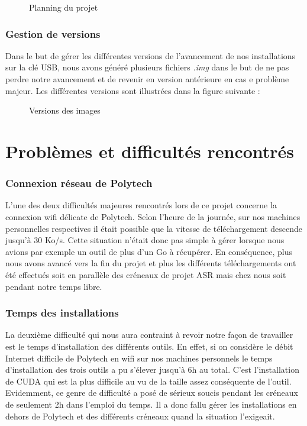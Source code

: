 \documentclass[final]{polytech/polytech}
\begin{document}
\begin{figure}
\caption{Planning du projet}
\label{fig:project_plan}
\end{figure}

\section{Gestion de versions}
Dans le but de gérer les différentes versions de l'avancement de nos installations sur la clé USB, nous avons généré plusieurs fichiers \textit{.img} dans le but de ne pas perdre notre avancement et de revenir en version antérieure en cas e problème majeur. Les différentes versions sont illustrées dans la figure suivante :

\begin{figure}
	\caption{Versions des images}
	\label{fig:images_versions}
\end{figure}

\part{Problèmes et difficultés rencontrés}

\section{Connexion réseau de Polytech}
L’une des deux difficultés majeures rencontrés lors de ce projet concerne la connexion wifi délicate de Polytech. Selon l’heure de la journée, sur nos machines personnelles respectives il était possible que la vitesse de téléchargement descende jusqu’à 30 Ko/s. Cette situation n’était donc pas simple à gérer lorsque nous avions par exemple un outil de plus d’un Go à récupérer. En conséquence, plus nous avons avancé vers la fin du projet et plus les différents téléchargements ont été effectués soit en parallèle des créneaux de projet ASR mais chez nous soit pendant notre temps libre.

\section{Temps des installations}
La deuxième difficulté qui nous aura contraint à revoir notre façon de travailler est le temps d’installation des différents outils. En effet, si on considère le débit Internet difficile de Polytech en wifi sur nos machines personnels le temps d’installation des trois outils a pu s’élever jusqu’à 6h au total. C’est l’installation de CUDA qui est la plus difficile au vu de la taille assez conséquente de l’outil. Evidemment, ce genre de difficulté a posé de sérieux soucis pendant les créneaux de seulement 2h dans l’emploi du temps. Il a donc fallu gérer les installations en dehors de Polytech et des différents créneaux quand la situation l’exigeait.
\end{document}
